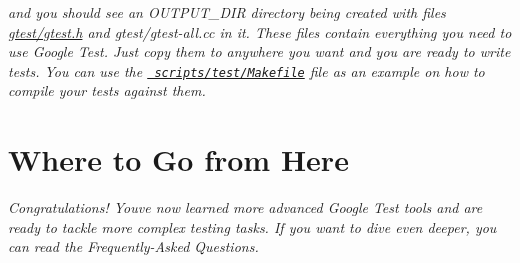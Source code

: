 {\itshape and you should see an {\ttfamily O\+U\+T\+P\+U\+T\+\_\+\+D\+IR} directory being created with files {\ttfamily \mbox{\hyperlink{gtest_8h_source}{gtest/gtest.\+h}}} and {\ttfamily gtest/gtest-\/all.\+cc} in it. These files contain everything you need to use Google Test. Just copy them to anywhere you want and you are ready to write tests. You can use the \href{../scripts/test/Makefile}\texttt{ scripts/test/\+Makefile} file as an example on how to compile your tests against them.}

{\itshape \section*{Where to Go from Here}}

{\itshape }

{\itshape Congratulations! You\textquotesingle{}ve now learned more advanced Google Test tools and are ready to tackle more complex testing tasks. If you want to dive even deeper, you can read the Frequently-\/\+Asked Questions. }